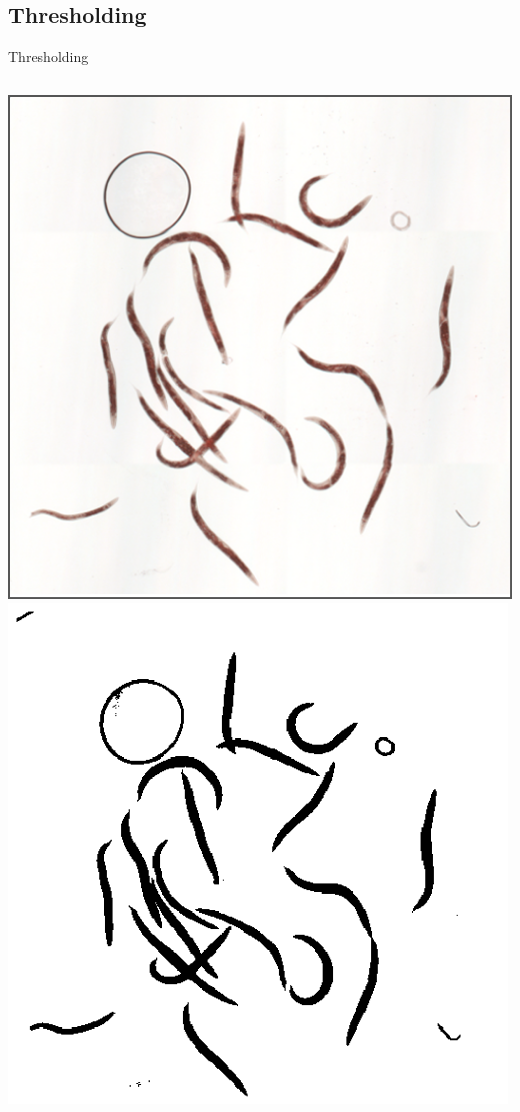 \documentclass{beamer}
\begin{document}
\subsection{Thresholding}
\begin{frame}{Thresholding}

\begin{columns}[c]
\column{1.5in}
\includegraphics[scale=0.27]{original}
\column{1.5in}
\includegraphics[scale=0.27]{thres/worms}

\end{columns}

\end{frame}
\end{document}
